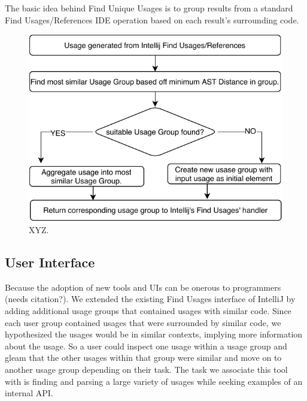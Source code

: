 \documentclass[conference]{IEEEtran}
\begin{document}


The basic idea behind Find Unique Usages is to group results from a standard Find Usages/References IDE operation based on each result's surrounding code.
\begin{figure}
    \centering
    \includegraphics [width=\columnwidth,keepaspectratio, clip]{figures/flowchart}
    \caption{XYZ. 
}
\label{fig:usege}
\end{figure}

\subsection{User Interface} 
Because the adoption of new tools and UIs can be onerous to programmers (needs citation?). We extended the existing Find Usages interface of IntelliJ by adding additional usage groups that contained usages with similar code. Since each user group contained usages that were surrounded by similar code, we hypothesized the usages would be in similar contexts, implying more information about the usage. So a user could inspect one usage within a usage group and gleam that the other usages within that group were similar and move on to another usage group depending on their task. The task we associate this tool with is finding and parsing a large variety of usages while seeking examples of an internal API.
\end{document}
